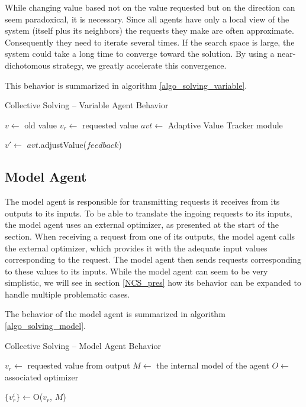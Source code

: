 While changing value based not on the value requested but on the direction can seem paradoxical, it is necessary. Since all agents have only a local view of the system (itself plus its neighbors) the requests they make are often approximate. Consequently they need to iterate several times. If the search space is large, the system could take a long time to converge toward the solution. By using a near-dichotomous strategy, we greatly accelerate this convergence.


This behavior is summarized in algorithm \ref{algo_solving_variable}.

\begin{algorithm}
\caption{Collective Solving -- Variable Agent Behavior}
\label{algo_solving_variable}

	$v \leftarrow$ old value\;
	$v_r \leftarrow$ requested value\;
	$avt \leftarrow$ Adaptive Value Tracker module \;
	
	$v' \leftarrow$ $avt$.adjustValue($feedback$)\;
	
\end{algorithm}

\subsection{Model Agent}\label{model_agent_solving}

The model agent is responsible for transmitting requests it receives from its outputs to its inputs. To be able to translate the ingoing requests to its inputs, the model agent uses an external optimizer, as presented at the start of the section. When receiving a request from one of its outputs, the model agent calls the external optimizer, which provides it with the adequate input values corresponding to the request. The model agent then sends requests corresponding to these values to its inputs.
While the model agent can seem to be very simplistic, we will see in section \ref{NCS_pres} how its behavior can be expanded to handle multiple problematic cases.

The behavior of the model agent is summarized in algorithm \ref{algo_solving_model}.

\begin{algorithm}
\caption{Collective Solving -- Model Agent Behavior}
\label{algo_solving_model}

	$v_r \leftarrow$ requested value from output\;
	$M \leftarrow$ the internal model of the agent\;
	$O \leftarrow$ associated optimizer\;
	
	$\{v_r^i\} \leftarrow $O($v_r$, $M$)\;
\end{algorithm}

